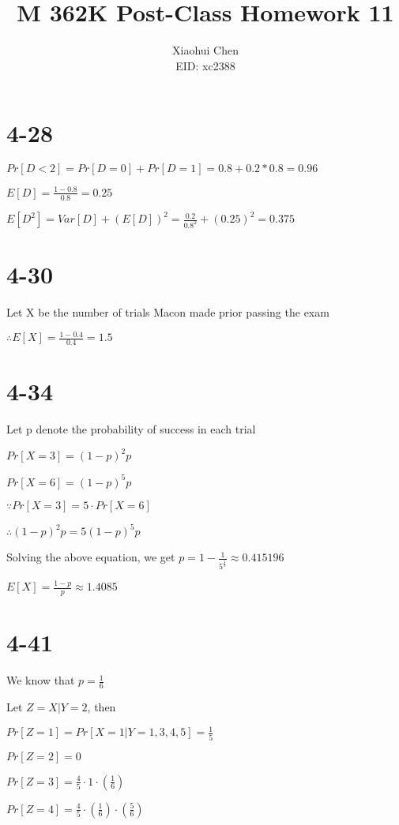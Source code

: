 \documentclass[12pt]{article}
\author{Xiaohui Chen \\EID: xc2388}
\title{M 362K Post-Class Homework 11}
\begin{document}
\maketitle
\begin{spacing}{2.0}

\section*{4-28}

$Pr[D<2]= Pr[D=0] + Pr[D=1] = 0.8 + 0.2*0.8= 0.96$

$E[D]= \frac{1-0.8}{0.8}= 0.25$

$E[D^2]= Var[D] + \left( E[D] \right)^2= \frac{0.2}{0.8^2} + \left( 0.25 \right)^2= 0.375$

\section*{4-30}

Let X be the number of trials Macon made prior passing the exam

$\therefore E[X]= \frac{1-0.4}{0.4}= 1.5$

\section*{4-34}

Let p denote the probability of success in each trial

$Pr[X=3]= (1-p)^2p$

$Pr[X=6]= (1-p)^5p$

$\because Pr[X=3]=5 \cdot Pr[X=6]$

$\therefore (1-p)^2p= 5(1-p)^5p$

Solving the above equation, we get $p= 1- \frac{1}{5^{ \frac{1}{3}}} \approx 0.415196$

$E[X]= \frac{1-p}{p} \approx 1.4085$

\section*{4-41}

We know that $p=\frac{1}{6}$

Let $Z=X|Y=2$, then 

$Pr[Z=1]= Pr[X=1|Y=1,3,4,5]= \frac{1}{5}$

$Pr[Z=2]= 0$

$Pr[Z=3] = \frac{4}{5} \cdot 1 \cdot \left( \frac{1}{6} \right)$

$Pr[Z=4]= \frac{4}{5} \cdot \left( \frac{1}{6} \right) \cdot \left( \frac{5}{6} \right)$


\end{spacing}
\end{document}
